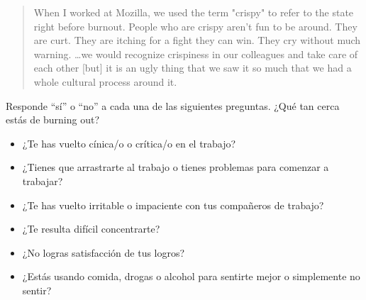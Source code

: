 \begin{quote}
  When I worked at Mozilla,
  we used the term "crispy" to refer to the state right before burnout.
  People who are crispy aren't fun to be around.
  They are curt.
  They are itching for a fight they can win.
  They cry without much warning.
  {\ldots}we would recognize crispiness in our colleagues and take care of each other
  [but] it is an ugly thing that we saw it so much that we had a whole cultural process around it.
\end{quote}

\noindent
Responde ``sí'' o ``no'' a cada una de las siguientes preguntas.
¿Qué tan cerca estás de burning out?

\begin{itemize}
\item ¿Te has vuelto cínica/o o crítica/o en el trabajo?
\item ¿Tienes que arrastrarte al trabajo o tienes problemas para comenzar a trabajar?
\item ¿Te has vuelto irritable o impaciente con tus compañeros de trabajo?
\item ¿Te resulta difícil concentrarte?
\item ¿No logras satisfacción de tus logros?
\item ¿Estás usando comida, drogas o alcohol para sentirte mejor o simplemente no sentir?
\end{itemize}
